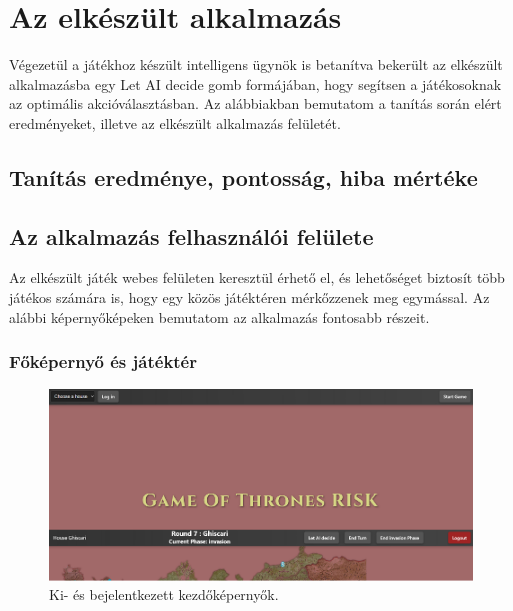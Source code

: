 \documentclass[
]{thesis-ekf}
\theoremstyle{definition}
\theoremstyle{remark}
\begin{document}
	
	
	\chapter{Az elkészült alkalmazás}
	
	Végezetül a játékhoz készült intelligens ügynök is betanítva bekerült az elkészült alkalmazásba egy Let AI decide gomb formájában, hogy segítsen a játékosoknak az optimális akcióválasztásban. Az alábbiakban bemutatom a tanítás során elért eredményeket, illetve az elkészült alkalmazás felületét.
	
	\section{Tanítás eredménye, pontosság, hiba mértéke}
	
	\section{Az alkalmazás felhasználói felülete}
	
	Az elkészült játék webes felületen keresztül érhető el, és lehetőséget biztosít több játékos számára is, hogy egy közös játéktéren mérkőzzenek meg egymással. Az alábbi képernyőképeken bemutatom az alkalmazás fontosabb részeit.
	
	\subsection*{Főképernyő és játéktér}
		
	\begin{figure}[ht!]
		\centering
		\includegraphics[width=16cm]{kezdokepernyo.png}
		\caption{Ki- és bejelentkezett kezdőképernyők.}
		\label{kezdokepernyo}
	\end{figure}
	
\end{document}
